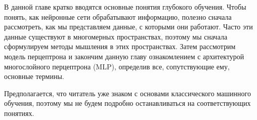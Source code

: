 В данной главе кратко вводятся основные понятия глубокого обучения. 
Чтобы понять, как нейронные сети обрабатывают информацию, 
полезно сначала рассмотреть, как мы представляем данные, 
с которыми они работают. Часто эти данные существуют в многомерных пространствах, 
поэтому мы сначала сформулируем методы мышления в этих пространствах.
Затем рассмотрим модель перцептрона и закончим данную главу ознакомлением с 
архитектурой многослойного перцептрона (MLP), 
определив все, сопутствующие ему, основные термины.

Предполагается, что читатель уже знаком с основами классического машинного обучения, 
поэтому мы не будем подробно останавливаться на соответствующих понятиях.







